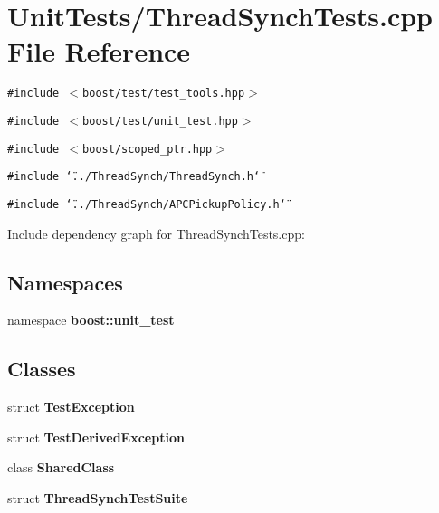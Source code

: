 \section{Unit\-Tests/Thread\-Synch\-Tests.cpp File Reference}
\label{_thread_synch_tests_8cpp}
{\tt \#include $<$boost/test/test\_\-tools.hpp$>$}\par
{\tt \#include $<$boost/test/unit\_\-test.hpp$>$}\par
{\tt \#include $<$boost/scoped\_\-ptr.hpp$>$}\par
{\tt \#include \char`\"{}../Thread\-Synch/Thread\-Synch.h\char`\"{}}\par
{\tt \#include \char`\"{}../Thread\-Synch/APCPickup\-Policy.h\char`\"{}}\par


Include dependency graph for Thread\-Synch\-Tests.cpp:\subsection*{Namespaces}
\begin{CompactItemize}
\item 
namespace {\bf boost::unit\_\-test}
\end{CompactItemize}
\subsection*{Classes}
\begin{CompactItemize}
\item 
struct {\bf Test\-Exception}
\item 
struct {\bf Test\-Derived\-Exception}
\item 
class {\bf Shared\-Class}
\item 
struct {\bf Thread\-Synch\-Test\-Suite}
\end{CompactItemize}
